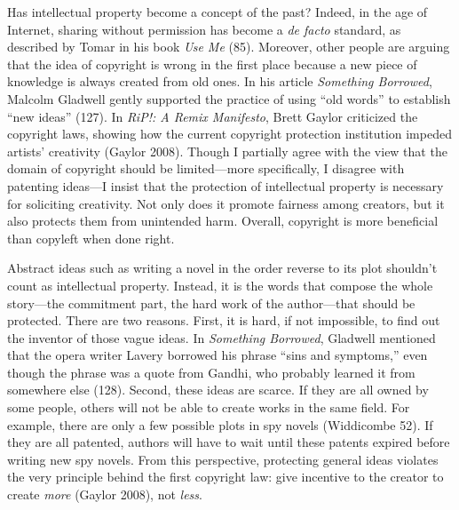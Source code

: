 Has intellectual property become a concept of the past? Indeed, in the
age of Internet, sharing without permission has become a \emph{de facto}
standard, as described by Tomar in his book \emph{Use Me} (85).
Moreover, other people are arguing that the idea of copyright is wrong
in the first place because a new piece of knowledge is always created
from old ones. In his article \emph{Something Borrowed}, Malcolm
Gladwell gently supported the practice of using ``old words'' to
establish ``new ideas'' (127). In \emph{RiP!: A Remix Manifesto}, Brett
Gaylor criticized the copyright laws, showing how the current copyright
protection institution impeded artists' creativity (Gaylor 2008). Though
I partially agree with the view that the domain of copyright should be
limited---more specifically, I disagree with patenting ideas---I insist
that the protection of intellectual property is necessary for soliciting
creativity. Not only does it promote fairness among creators, but it
also protects them from unintended harm. Overall, copyright is more
beneficial than copyleft when done right.

Abstract ideas such as writing a novel in the order reverse to its plot
shouldn't count as intellectual property. Instead, it is the words that
compose the whole story---the commitment part, the hard work of the
author---that should be protected. There are two reasons. First, it is
hard, if not impossible, to find out the inventor of those vague ideas.
In \emph{Something Borrowed}, Gladwell mentioned that the opera writer
Lavery borrowed his phrase ``sins and symptoms,'' even though the phrase
was a quote from Gandhi, who probably learned it from somewhere else
(128). Second, these ideas are scarce. If they are all owned by some
people, others will not be able to create works in the same field. For
example, there are only a few possible plots in spy novels (Widdicombe
52). If they are all patented, authors will have to wait until these
patents expired before writing new spy novels. From this perspective,
protecting general ideas violates the very principle behind the first
copyright law: give incentive to the creator to create \emph{more}
(Gaylor 2008), not \emph{less}.

